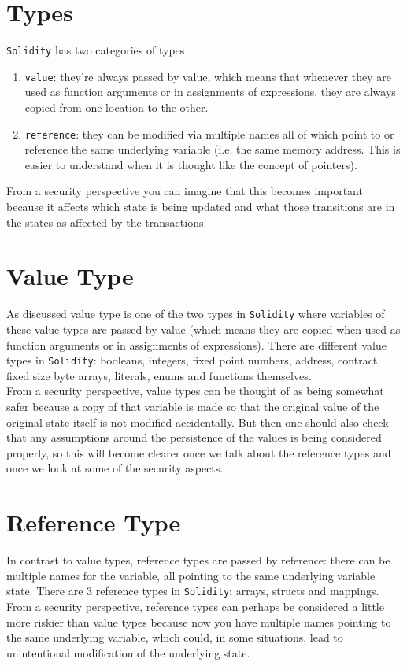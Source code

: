 \section{Types}
\texttt{Solidity} has two categories of types

\begin{enumerate}
\item\texttt{value}: they're always passed by value, which means that whenever they are used as function arguments or in assignments of expressions, they are always copied from one location to the other.
\item\texttt{reference}: they can be modified via multiple names all of which point to or reference the same underlying variable (i.e. the same memory address. This is easier to understand when it is thought like the concept of pointers).
\end{enumerate}

From a security perspective you can imagine that this becomes important because it affects which state is being updated and what those transitions are in the states as affected by the transactions.

\section{Value Type}
As discussed value type is one of the two types in \texttt{Solidity} where variables of these value types are passed by value (which means they are copied when used as function arguments or in assignments of expressions). There are different value types in \texttt{Solidity}: booleans, integers, fixed point numbers, address, contract, fixed size byte arrays, literals, enums and functions themselves.\\

From a security perspective, value types can be thought of as being somewhat safer because a copy of that variable is made so that the original value of the original state itself is not modified accidentally. But then one should also check that any assumptions around the persistence of the values is being considered properly, so this will become clearer once we talk about the reference types and once we look at some of the security aspects.

\section{Reference Type}
In contrast to value types, reference types are passed by reference: there can be multiple names for the variable, all pointing to the same underlying variable state. There are 3 reference types in \texttt{Solidity}: arrays, structs and mappings. From a security perspective, reference types can perhaps be considered a little more riskier than value types because now you have multiple names pointing to the same underlying variable, which could, in some situations, lead to unintentional modification of the underlying state.


